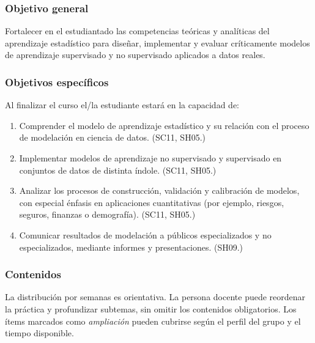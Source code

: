 \begin{refsection}
\subsubsection*{Objetivo general}

Fortalecer en el estudiantado las competencias teóricas y analíticas del aprendizaje estadístico para diseñar, implementar y evaluar críticamente modelos de aprendizaje supervisado y no supervisado aplicados a datos reales.

\subsubsection*{Objetivos específicos}

Al finalizar el curso el/la estudiante estará en la capacidad de:

\begin{enumerate}
\item Comprender el modelo de aprendizaje estadístico y su relación con el proceso de modelación en ciencia de datos. (SC11, SH05.)
\item Implementar modelos de aprendizaje no supervisado y supervisado en conjuntos de datos de distinta índole. (SC11, SH05.)
\item Analizar los procesos de construcción, validación y calibración de modelos, con especial énfasis en aplicaciones cuantitativas (por ejemplo, riesgos, seguros, finanzas o demografía). (SC11, SH05.)
\item Comunicar resultados de modelación a públicos especializados y no especializados, mediante informes y presentaciones. (SH09.)
\end{enumerate}

\subsubsection*{Contenidos}

La distribución por semanas es orientativa. La persona docente puede reordenar la práctica y profundizar subtemas, sin omitir los contenidos obligatorios. Los ítems marcados como \emph{ampliación} pueden cubrirse según el perfil del grupo y el tiempo disponible.


\end{refsection}
